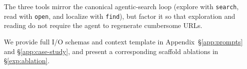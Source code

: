 \smallskip
The three tools mirror the canonical agentic-search loop (explore with \texttt{search}, read with \texttt{open}, and localize with \texttt{find}), but factor it so that exploration and reading do not require the agent to regenerate cumbersome URLs.


We provide full I/O schemas and context template in Appendix~\S\ref{app:prompts} and \S\ref{app:case-study}, and present a corresponding scaffold ablations in \S\ref{exp:ablation}.